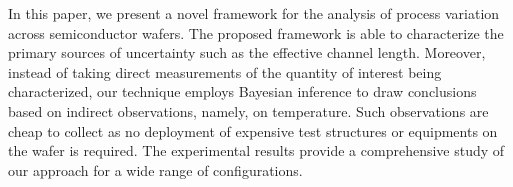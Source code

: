 In this paper, we present a novel framework for the analysis of process variation across semiconductor wafers.
The proposed framework is able to characterize the primary sources of uncertainty such as the effective channel length.
Moreover, instead of taking direct measurements of the quantity of interest being characterized, our technique employs Bayesian inference to draw conclusions based on indirect observations, namely, on temperature. Such observations are cheap to collect as no deployment of expensive test structures or equipments on the wafer is required.
The experimental results provide a comprehensive study of our approach for a wide range of configurations.
